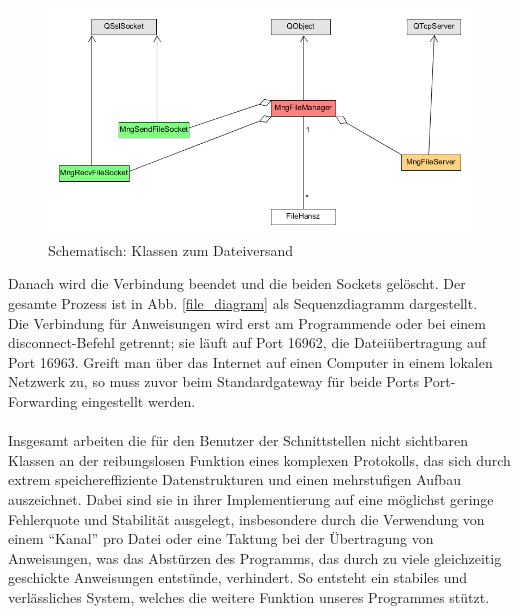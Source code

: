 \begin{figure}
\includegraphics[scale=.35]{classDiagFile}
\caption{Schematisch: Klassen zum Dateiversand}
\label{file_d}
\end{figure}

Danach wird die Verbindung beendet und die beiden Sockets gelöscht.
Der gesamte Prozess ist in Abb. \ref{file_diagram} als Sequenzdiagramm dargestellt.\\
Die Verbindung für Anweisungen wird erst am Programmende oder bei einem disconnect-Befehl getrennt; sie läuft auf Port 16962, die Dateiübertragung auf Port 16963.
Greift man über das Internet auf einen Computer in einem lokalen Netzwerk zu, so muss zuvor beim Standardgateway für beide Ports Port-Forwarding eingestellt werden.\\\\
Insgesamt arbeiten die für den Benutzer der Schnittstellen nicht sichtbaren Klassen an der reibungslosen Funktion eines komplexen Protokolls, das sich durch extrem speichereffiziente Datenstrukturen und einen mehrstufigen Aufbau auszeichnet.
Dabei sind sie in ihrer Implementierung auf eine möglichst geringe Fehlerquote und Stabilität ausgelegt, insbesondere durch die Verwendung von einem "`Kanal"' pro Datei oder eine Taktung bei der Übertragung von Anweisungen, was das Abstürzen des Programms, das durch zu viele gleichzeitig geschickte Anweisungen entstünde, verhindert.
So entsteht ein stabiles und verlässliches System, welches die weitere Funktion unseres Programmes stützt.
%